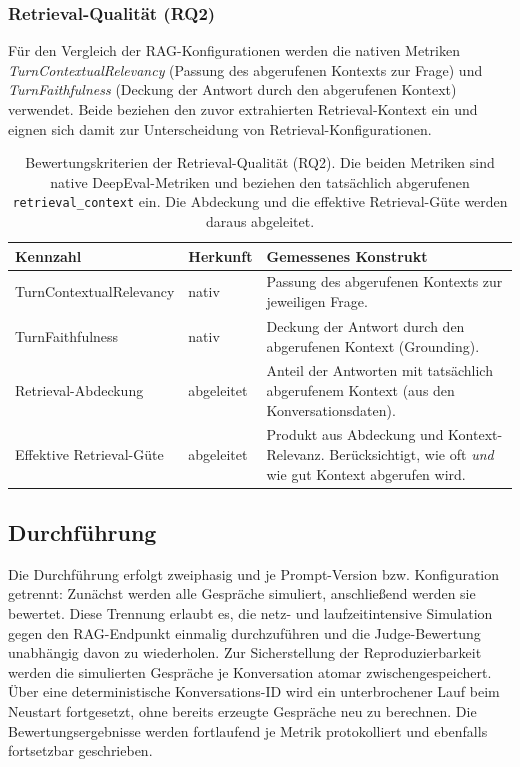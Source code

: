 \subsubsection{Retrieval-Qualität (RQ2)}

Für den Vergleich der RAG-Konfigurationen werden die nativen Metriken
\emph{TurnContextualRelevancy} (Passung des abgerufenen Kontexts zur Frage) und
\emph{TurnFaithfulness} (Deckung der Antwort durch den abgerufenen Kontext) verwendet.
Beide beziehen den zuvor extrahierten Retrieval-Kontext ein und eignen sich damit zur
Unterscheidung von Retrieval-Konfigurationen.

\begin{table}[htbp]
  \centering
  \caption{Bewertungskriterien der Retrieval-Qualit\"at (RQ2). Die beiden Metriken sind
  native DeepEval-Metriken und beziehen den tats\"achlich abgerufenen
  \texttt{retrieval\_context} ein. Die Abdeckung und die effektive Retrieval-G\"ute
  werden daraus abgeleitet.}
  \label{tab:rq2-kriterien}
  \small
  \begin{tabular}{p{4.0cm}p{2.0cm}p{7.0cm}}
    \toprule
    \textbf{Kennzahl} & \textbf{Herkunft} & \textbf{Gemessenes Konstrukt} \\
    \midrule
    TurnContextualRelevancy & nativ & Passung des abgerufenen Kontexts zur jeweiligen Frage. \\
    \addlinespace
    TurnFaithfulness        & nativ & Deckung der Antwort durch den abgerufenen Kontext (Grounding). \\
    \addlinespace
    Retrieval-Abdeckung     & abgeleitet & Anteil der Antworten mit tats\"achlich abgerufenem Kontext (aus den Konversationsdaten). \\
    \addlinespace
    Effektive Retrieval-G\"ute & abgeleitet & Produkt aus Abdeckung und Kontext-Relevanz. Ber\"ucksichtigt, wie oft \emph{und} wie gut Kontext abgerufen wird. \\
    \bottomrule
  \end{tabular}
\end{table}

\subsection{Durchführung}
\label{subsec:durchfuehrung}

Die Durchführung erfolgt zweiphasig und je Prompt-Version bzw. Konfiguration getrennt:
Zunächst werden alle Gespräche simuliert, anschließend werden sie bewertet. Diese
Trennung erlaubt es, die netz- und laufzeitintensive Simulation gegen den
RAG-Endpunkt einmalig durchzuführen und die Judge-Bewertung unabhängig davon zu
wiederholen. Zur Sicherstellung der Reproduzierbarkeit werden die simulierten Gespräche
je Konversation atomar zwischengespeichert. Über eine deterministische Konversations-ID
wird ein unterbrochener Lauf beim Neustart fortgesetzt, ohne bereits erzeugte Gespräche
neu zu berechnen. Die Bewertungsergebnisse werden fortlaufend je Metrik protokolliert
und ebenfalls fortsetzbar geschrieben.

